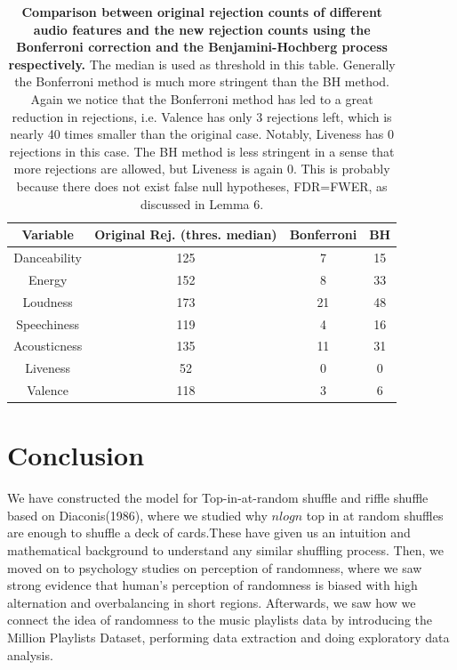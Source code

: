 \documentclass[12pt]{article}
\theoremstyle{plain}
\theoremstyle{definition}
\theoremstyle{remark}
\begin{document}
\begin{table}[h!]
    \centering
    \begin{tabular}{|c|c|c|c|}
       \hline
       Variable & Original Rej. (thres. median) & Bonferroni & BH\\
       \hline
        Danceability &125 &7&15\\
        \hline
        Energy & 152&8&33\\
        \hline
        Loudness & 173&21&48\\
        \hline
        Speechiness & 119&4&16\\
        \hline
        Acousticness &135 &11&31\\
        \hline
        Liveness &52 &0&0\\
        \hline
        Valence & 118&3&6\\
        \hline
    \end{tabular}
    \caption{\textbf{Comparison between original rejection counts of different audio features and the new rejection counts using the Bonferroni correction and the Benjamini-Hochberg process respectively.} The median is used as threshold in this table. Generally the Bonferroni method is much more stringent than the BH method. Again we notice that the Bonferroni method has led to a great reduction in rejections, i.e. Valence has only 3 rejections left, which is nearly 40 times smaller than the original case. Notably, Liveness has 0 rejections in this case. The BH method is less stringent in a sense that more rejections are allowed, but Liveness is again 0. This is probably because there does not exist false null hypotheses, FDR=FWER, as discussed in Lemma 6. }
    \label{table 6}
\end{table}
\clearpage


\section{Conclusion}
We have constructed the model for Top-in-at-random shuffle and riffle shuffle based on Diaconis(1986), where we studied why $nlogn$ top in at random shuffles are enough to shuffle a deck of cards.These have given us an intuition and mathematical background to understand any similar shuffling process. Then, we moved on to psychology studies on perception of randomness, where we saw strong evidence that human's perception of randomness is biased with high alternation and overbalancing in short regions. Afterwards, we saw how we connect the idea of randomness to the music playlists data by introducing the Million Playlists Dataset, performing data extraction and doing exploratory data analysis. 
\end{document}
